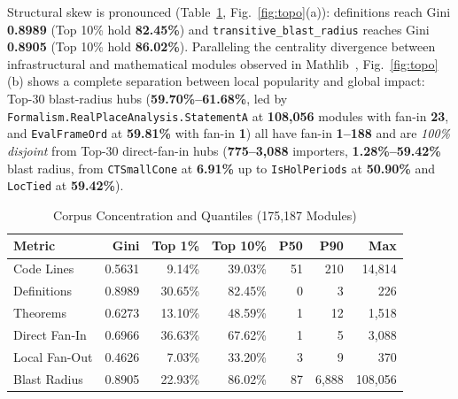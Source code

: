 \documentclass[10pt,twocolumn]{article}
\newcommand{\ub}{\_\allowbreak}
\begin{document}
Structural skew is pronounced (Table~\ref{tab:topo}, Fig.~\ref{fig:topo}(a)): definitions reach Gini \textbf{0.8989} (Top 10\% hold \textbf{82.45\%}) and \texttt{transitive\ub blast\ub radius} reaches Gini \textbf{0.8905} (Top 10\% hold \textbf{86.02\%}). Paralleling the centrality divergence between infrastructural and mathematical modules observed in Mathlib~\cite{Li202624797}, Fig.~\ref{fig:topo}(b) shows a complete separation between local popularity and global impact: Top-30 blast-radius hubs (\textbf{59.70\%--61.68\%}, led by \texttt{Formalism.RealPlaceAnalysis.StatementA} at \textbf{108,056} modules with fan-in \textbf{23}, and \texttt{EvalFrameOrd} at \textbf{59.81\%} with fan-in \textbf{1}) all have fan-in \textbf{1--188} and are \emph{100\% disjoint} from Top-30 direct-fan-in hubs (\textbf{775--3,088} importers, \textbf{1.28\%--59.42\%} blast radius, from \texttt{CTSmallCone} at \textbf{6.91\%} up to \texttt{IsHolPeriods} at \textbf{50.90\%} and \texttt{LocTied} at \textbf{59.42\%}).

\begin{table}[t]
\centering
\caption{Corpus Concentration and Quantiles (175,187 Modules)}
\label{tab:topo}
\footnotesize
\setlength{\tabcolsep}{3.0pt}
\begin{tabular}{@{}lrrrrrr@{}}
\toprule
\textbf{Metric} & \textbf{Gini} & \textbf{Top 1\%} & \textbf{Top 10\%} & \textbf{P50} & \textbf{P90} & \textbf{Max} \\
\midrule
Code Lines & 0.5631 & 9.14\% & 39.03\% & 51 & 210 & 14,814 \\
Definitions & 0.8989 & 30.65\% & 82.45\% & 0 & 3 & 226 \\
Theorems & 0.6273 & 13.10\% & 48.59\% & 1 & 12 & 1,518 \\
Direct Fan-In & 0.6966 & 36.63\% & 67.62\% & 1 & 5 & 3,088 \\
Local Fan-Out & 0.4626 & 7.03\% & 33.20\% & 3 & 9 & 370 \\
Blast Radius & 0.8905 & 22.93\% & 86.02\% & 87 & 6,888 & 108,056 \\
\bottomrule
\end{tabular}
\end{table}
\end{document}
